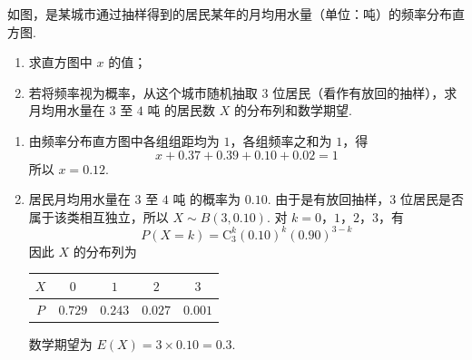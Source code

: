 \begin{problem}
如图，是某城市通过抽样得到的居民某年的月均用水量（单位：吨）的频率分布直方图.

\begin{enumerate}
\item 求直方图中 \(x\) 的值；
\item 若将频率视为概率，从这个城市随机抽取 \(3\) 位居民（看作有放回的抽样），求月均用水量在 \(3\) 至 \(4\text{ 吨}\) 的居民数 \(X\) 的分布列和数学期望.
\end{enumerate}


\begin{solution}
\begin{enumerate}
\item 由频率分布直方图中各组组距均为 \(1\)，各组频率之和为 \(1\)，得
\[
x+0.37+0.39+0.10+0.02=1
\]
所以 \(x=0.12\).
\item 居民月均用水量在 \(3\) 至 \(4\text{ 吨}\) 的概率为 \(0.10\). 由于是有放回抽样，\(3\) 位居民是否属于该类相互独立，所以 \(X\sim B(3,0.10)\). 对 \(k=0\)，\(1\)，\(2\)，\(3\)，有
\[
P(X=k)=\mathrm C_{3}^{k}(0.10)^k(0.90)^{3-k}
\]
因此 \(X\) 的分布列为
\begin{center}
\begin{tabular}{c|cccc}
\(X\) & \(0\) & \(1\) & \(2\) & \(3\) \\
\hline
\(P\) & \(0.729\) & \(0.243\) & \(0.027\) & \(0.001\)
\end{tabular}
\end{center}
数学期望为 \(E(X)=3\times0.10=0.3\).
\end{enumerate}
\end{solution}
\end{problem}

